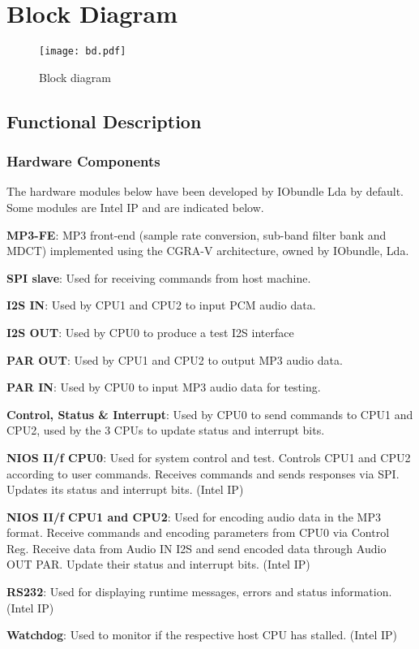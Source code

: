 \documentclass{rep}
\theoremstyle{plain}
\begin{document}
\clearpage

\section{Block Diagram}
\label{sec:bd}

\begin{figure}[h]
  \begin{center}
    \texttt{[image: bd.pdf]}
    \caption{Block diagram}
    \label{fig:bd}
  \end{center}
\end{figure}
\clearpage

\subsection{Functional Description}
\label{sec:func}

\subsubsection{Hardware Components}

The hardware modules below have been developed by IObundle Lda by default. Some
modules are Intel IP and are indicated below.

\begin{description}
\item {\bf MP3-FE}: MP3 front-end (sample rate conversion, sub-band filter bank
  and MDCT) implemented using the CGRA-V architecture, owned by IObundle, Lda.
\item {\bf SPI slave}: Used for receiving commands from host machine.
\item {\bf I2S IN}: Used by CPU1 and CPU2 to input PCM audio data.
\item {\bf I2S OUT}: Used by CPU0 to produce a test I2S interface
\item {\bf PAR OUT}: Used by CPU1 and CPU2 to output MP3 audio data.
\item {\bf PAR IN}: Used by CPU0 to input MP3 audio data for testing.
\item {\bf Control, Status \& Interrupt}: Used by CPU0 to send commands to CPU1
  and CPU2, used by the 3 CPUs to update status and interrupt bits.
\item {\bf NIOS II/f CPU0}: Used for system control and test. Controls CPU1 and
  CPU2 according to user commands. Receives commands and sends
  responses via SPI. Updates its status and interrupt bits. (Intel IP)
\item {\bf NIOS II/f CPU1 and CPU2}: Used for encoding audio data in the MP3
  format. Receive commands and encoding parameters from CPU0 via Control
  Reg. Receive data from Audio IN I2S and send encoded data through Audio OUT
  PAR. Update their status and interrupt bits. (Intel IP)
\item {\bf RS232}: Used for displaying runtime messages, errors and status
  information. (Intel IP)
\item {\bf Watchdog}: Used to monitor if the respective host CPU has
  stalled. (Intel IP)
\end{description}
\end{document}
